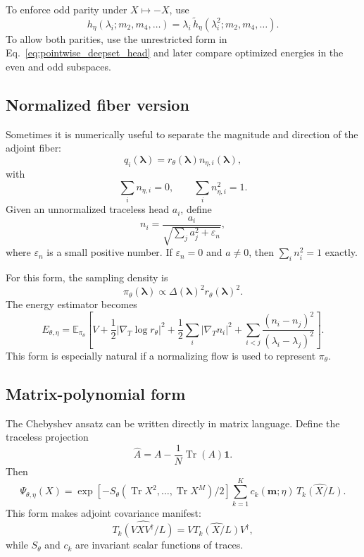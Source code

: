 \documentclass[11pt]{article}
\newcommand{\Tr}{\operatorname{Tr}}
\newcommand{\one}{\mathbf 1}
\newcommand{\E}{\mathbb E}
\newcommand{\gradT}{\nabla_{\!T}}
\newcommand{\eps}{\varepsilon}
\begin{document}
To enforce odd parity under $X\mapsto -X$, use
\begin{equation}
 h_\eta(\lambda_i;m_2,m_4,\ldots)
 =\lambda_i\,\widetilde h_\eta(\lambda_i^2;m_2,m_4,
\ldots).
\end{equation}
To allow both parities, use the unrestricted form in Eq.~\eqref{eq:pointwise_deepset_head} and later compare optimized energies in the even and odd subspaces.

\subsection{Normalized fiber version}

Sometimes it is numerically useful to separate the magnitude and direction of the adjoint fiber:
\begin{equation}
q_i(\bm\lambda)=r_\theta(\bm\lambda)n_{\eta,i}(\bm\lambda),
\end{equation}
with
\begin{equation}
\sum_i n_{\eta,i}=0,
\qquad
\sum_i n_{\eta,i}^2=1.
\end{equation}
Given an unnormalized traceless head $a_i$, define
\begin{equation}
\boxed{
 n_i=\frac{a_i}{\sqrt{\sum_j a_j^2+\eps_n}},
}
\label{eq:normalized_fiber}
\end{equation}
where $\eps_n$ is a small positive number.  If $\eps_n=0$ and $a\neq0$, then $\sum_i n_i^2=1$ exactly.

For this form, the sampling density is
\begin{equation}
\pi_\theta(\bm\lambda)
\propto \Delta(\bm\lambda)^2r_\theta(\bm\lambda)^2.
\end{equation}
The energy estimator becomes
\begin{equation}
\boxed{
E_{\theta,\eta}
=\E_{\pi_\theta}\left[
V
+\frac12|\gradT\log r_\theta|^2
+\frac12\sum_i|\gradT n_i|^2
+\sum_{i<j}\frac{(n_i-n_j)^2}{(\lambda_i-\lambda_j)^2}
\right].
}
\label{eq:rn_energy}
\end{equation}
This form is especially natural if a normalizing flow is used to represent $\pi_\theta$.

\subsection{Matrix-polynomial form}

The Chebyshev ansatz can be written directly in matrix language.  Define the traceless projection
\begin{equation}
\widehat A=A-\frac1N\Tr(A)\one.
\end{equation}
Then
\begin{equation}
\boxed{
\Psi_{\theta,\eta}(X)
=\exp[-S_\theta(\Tr X^2,\ldots,\Tr X^M)/2]
\sum_{k=1}^K c_k(\bm m;\eta)\,
\widehat{T_k(X/L)}.
}
\label{eq:matrix_polynomial_ansatz}
\end{equation}
This form makes adjoint covariance manifest:
\begin{equation}
\widehat{T_k(VXV^\dagger/L)}=V\widehat{T_k(X/L)}V^\dagger,
\end{equation}
while $S_\theta$ and $c_k$ are invariant scalar functions of traces.
\end{document}
